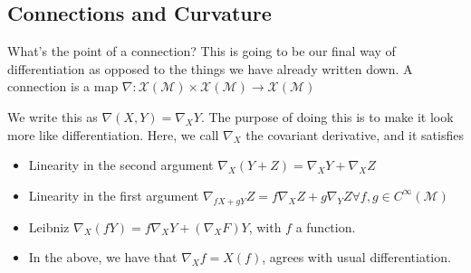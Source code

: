 \subsection{Connections and Curvature} 
What's the point of a connection? 
This is going to be our final way of differentiation as opposed to 
the things we have already written down. 
A connection is a map $ \nabla  : \mathcal{ X } ( \mathcal{ M } ) \times \mathcal{ X } ( \mathcal{ M } ) \to \mathcal{ X } ( \mathcal{ M } ) $

We write this as $ \nabla  ( X, Y )  = \nabla _{ X } Y $. 
The purpose of doing this is to make it look more like differentiation. 
Here, we call $ \nabla  _ X $ the covariant derivative, and it satisfies 
\begin{itemize}
	\item Linearity in the second argument $ \nabla _ X ( Y + Z )  = \nabla _ X Y + \nabla _ X Z $
	\item Linearity in the first argument $ \nabla _{ f X + g Y }  Z = f \nabla _ X Z + g \nabla _ Y Z \forall f, g \in C^\infty ( \mathcal{ M } ) $
	\item Leibniz $ \nabla _ X ( f Y )  = f \nabla _ X Y + ( \nabla _ X F ) Y $, with $ f $ a function. 
	\item In the above, we have that $ \nabla _ X f = X ( f ) $, agrees with usual differentiation. 
\end{itemize} 

